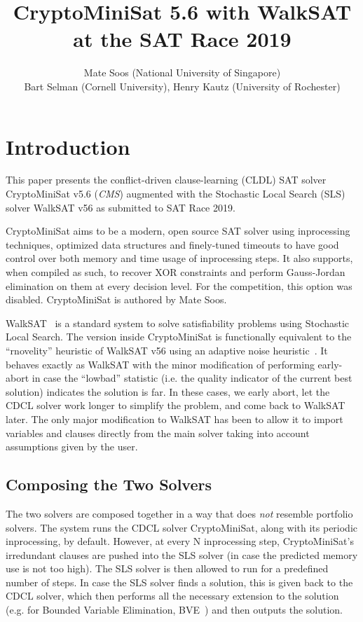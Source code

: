 \documentclass[final]{ieee}
\begin{document}
\title{CryptoMiniSat 5.6 with WalkSAT at the SAT Race 2019}
\author{Mate Soos (National University of Singapore)\\
Bart Selman (Cornell University), Henry Kautz (University of Rochester)}

\maketitle
\thispagestyle{empty}
\pagestyle{empty}

\section{Introduction}
This paper presents the conflict-driven clause-learning (CLDL) SAT solver CryptoMiniSat v5.6 (\emph{CMS}) augmented with the Stochastic Local Search (SLS)~\cite{Selman95localsearch} solver WalkSAT v56 as submitted to SAT Race 2019.

CryptoMiniSat aims to be a modern, open source SAT solver using inprocessing techniques, optimized data structures and finely-tuned timeouts to have good control over both memory and time usage of inprocessing steps. It also supports, when compiled as such, to recover XOR constraints and perform Gauss-Jordan elimination on them at every decision level. For the competition, this option was disabled. CryptoMiniSat is authored by Mate Soos.

WalkSAT~\cite{DBLP:conf/aaai/KautzS96} is a standard system to solve satisfiability problems using Stochastic Local Search. The version inside CryptoMiniSat is functionally equivalent to the ``rnovelity'' heuristic of WalkSAT v56 using an adaptive noise heuristic~\cite{DBLP:conf/aaai/Hoos02}. It behaves exactly as WalkSAT with the minor modification of performing early-abort in case the ``lowbad'' statistic (i.e. the quality indicator of the current best solution) indicates the solution is far. In these cases, we early abort, let the CDCL solver work longer to simplify the problem, and come back to WalkSAT later. The only major modification to WalkSAT has been to allow it to import variables and clauses directly from the main solver taking into account assumptions given by the user.

\subsection{Composing the Two Solvers}
The two solvers are composed together in a way that does \emph{not} resemble portfolio solvers. The system runs the CDCL solver CryptoMiniSat, along with its periodic inprocessing, by default. However, at every N inprocessing step, CryptoMiniSat's irredundant clauses are pushed into the SLS solver (in case the predicted memory use is not too high). The SLS solver is then allowed to run for a predefined number of steps. In case the SLS solver finds a solution, this is given back to the CDCL solver, which then performs all the necessary extension to the solution (e.g. for Bounded Variable Elimination, BVE~\cite{BVE}) and then outputs the solution.
\end{document}
